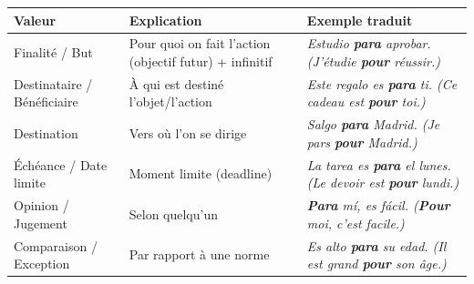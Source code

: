 \documentclass[11pt]{article}
\newcommand{\esp}[1]{\ifmmode\text{\textit{#1}}\else\begingroup\selectlanguage{spanish}\itshape #1\endgroup\fi}
\begin{document}
\begin{propriete}
\begin{center}
\begin{tabularx}{\linewidth}{|l|X|X|}
\hline
\rowcolor{poporangeL} \textbf{Valeur} & \textbf{Explication} & \textbf{Exemple traduit} \\
\hline
Finalité / But & Pour quoi on fait l'action (objectif futur) + infinitif & \esp{Estudio \textbf{para} aprobar.} (J'étudie \textbf{pour} réussir.) \\
\hline
Destinataire / Bénéficiaire & À qui est destiné l'objet/l'action & \esp{Este regalo es \textbf{para} ti.} (Ce cadeau est \textbf{pour} toi.) \\
\hline
Destination & Vers où l'on se dirige & \esp{Salgo \textbf{para} Madrid.} (Je pars \textbf{pour} Madrid.) \\
\hline
Échéance / Date limite & Moment limite (deadline) & \esp{La tarea es \textbf{para} el lunes.} (Le devoir est \textbf{pour} lundi.) \\
\hline
Opinion / Jugement & Selon quelqu'un & \esp{\textbf{Para} mí, es fácil.} (\textbf{Pour} moi, c'est facile.) \\
\hline
Comparaison / Exception & Par rapport à une norme & \esp{Es alto \textbf{para} su edad.} (Il est grand \textbf{pour} son âge.) \\
\hline
\end{tabularx}
\end{center}
\end{propriete}
\end{document}
